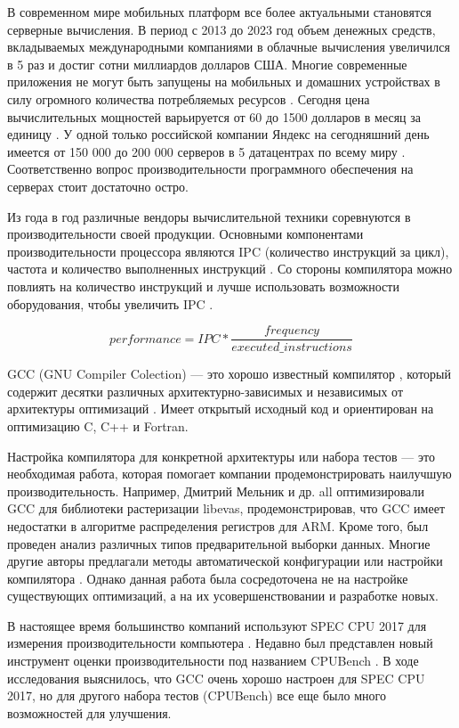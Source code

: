 
{\actuality} В современном мире мобильных платформ все более актуальными становятся серверные вычисления. В период с 2013 до 2023 год объем денежных средств, вкладываемых  международными компаниями в облачные вычисления увеличился в 5 раз \cite{spendingCloud,alam2020cloud} и достиг сотни миллиардов долларов США. Многие современные приложения не могут быть запущены на мобильных и домашних устройствах в силу огромного количества потребляемых ресурсов \cite{marinescu2022cloud}.
Сегодня цена вычислительных мощностей варьируется от 60 до 1500  долларов в месяц за единицу \cite{costCloud}.  У одной только российской компании Яндекс на сегодняшний день имеется от 150 000  до 200 000 серверов в 5 датацентрах по всему миру \cite{Yndx2}. Соответственно вопрос производительности программного обеспечения на серверах стоит достаточно остро.

Из года в год различные вендоры вычислительной техники соревнуются в производительности своей продукции. Основными компонентами производительности процессора являются IPC (количество инструкций за цикл), частота и количество выполненных инструкций \cite{hennessy2011computer}. Со стороны компилятора можно повлиять на количество инструкций и лучше использовать возможности оборудования, чтобы увеличить IPC \cite{alvares2021instruction}.

$$performance = IPC * \dfrac{frequency}{executed\_instructions}$$

GCC (GNU Compiler Colection) — это хорошо известный компилятор \cite{schmitt2020 Performance}, который содержит десятки различных архитектурно-зависимых и независимых от архитектуры оптимизаций \cite {rodriguez2021compiler}. Имеет открытый исходный код и ориентирован на оптимизацию C, C++ и Fortran.

Настройка компилятора для конкретной архитектуры или набора тестов — это необходимая работа, которая помогает компании продемонстрировать наилучшую производительность. Например, Дмитрий Мельник и др. all \cite{melnik2010case} оптимизировали GCC для библиотеки растеризации libevas, продемонстрировав, что GCC имеет недостатки в алгоритме распределения регистров для ARM. Кроме того, был проведен анализ различных типов предварительной выборки данных. Многие другие авторы предлагали методы автоматической конфигурации или настройки компилятора \cite{plotnikov2013automatic,ashouri2018survey,cereda2020collaborative}. Однако данная работа была сосредоточена не на настройке существующих оптимизаций, а на их усовершенствовании и разработке новых.


В настоящее время большинство компаний используют SPEC CPU 2017 для измерения производительности компьютера \cite{panda2018wait,bucek2018spec}. Недавно был представлен новый инструмент оценки производительности под названием CPUBench \cite {lu2023cpubench}. В ходе исследования выяснилось, что GCC очень хорошо настроен для SPEC CPU 2017, но для другого набора тестов (CPUBench) все еще было много возможностей для улучшения.

